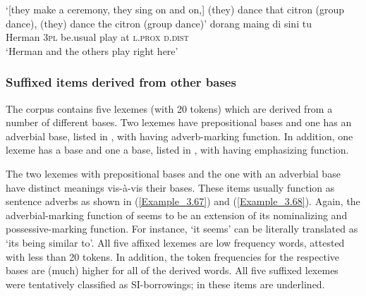 \glt 
‘[they make a ceremony, they sing on and on,] (they) dance that citron (group dance),  (they) dance the citron (group dance)’ \textstyleExampleSource{[081110-005-CvPr.0098]}
\z
\ea
\label{Example_3.66}
 {dorang} {} {maing} {di} {sini} {tu}\\ %
 Herman  \textsc{3pl}  be.usual  play  at  \textsc{l.prox}  \textsc{d.dist}\\
\glt
‘Herman and the others  play right here’ \textstyleExampleSource{[080923-009-Cv.0017]}
\z

\subsubsection[Suffixed items derived from other bases]{Suffixed items derived from other bases}\label{Para_3.1.6.3}

The corpus contains five lexemes (with 20 tokens) which are derived from a number of different bases. Two lexemes have prepositional bases and one has an adverbial base, listed in , with  having adverb-marking function. In addition, one lexeme has a  base and one a  base, listed in , with  having emphasizing function.



The two lexemes with prepositional bases and the one with an adverbial base have distinct meanings vis-à-vis their bases. These items usually function as sentence adverbs as shown in (\ref{Example_3.67}) and (\ref{Example_3.68}). Again, the adverbial-marking function of  seems to be an extension of its nominalizing and possessive-marking function. For instance,  ‘it seems’ can be literally translated as ‘its being similar to’. All five affixed lexemes are low frequency words, attested with less than 20 tokens. In addition, the token frequencies for the respective bases are (much) higher for all of the derived words. All five suffixed lexemes were tentatively classified as SI-borrowings; in  these items are underlined.

